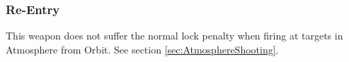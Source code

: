 \subsubsection{Re-Entry}

This weapon does not suffer the normal lock penalty when firing at targets in Atmosphere from Orbit. See section \ref{sec:AtmosphereShooting}.